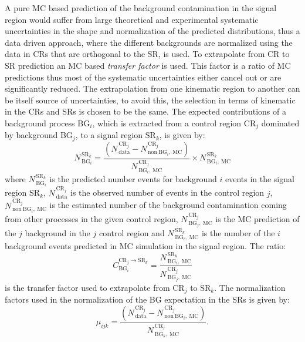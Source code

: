 A pure MC based prediction of the background contamination in the signal region
would suffer from large theoretical and experimental systematic uncertainties in
the shape and normalization of the predicted distributions, thus a data driven
approach, where the different backgrounds are normalized using the data in CRs
that are orthogonal to the SR, is used. To extrapolate from CR to SR prediction
an MC based \emph{transfer factor} is used. This factor is a ratio of MC
predictions thus most of the systematic uncertainties either cancel out or are
significantly reduced. The extrapolation from one kinematic region to another
can be itself source of uncertainties, to avoid this, the selection in terms of
kinematic in the CRs and SRs is chosen to be the same. The expected
contributions of a background process BG$_i$, which is extracted from a control
region CR$_j$ dominated by background BG$_j$, to a signal region SR$_k$, is
given by:
\begin{equation}
  \label{eq:83}
  N_{\mathrm{\, BG}_i}^{\mathrm{\, SR}_k} = \frac{(N_\mathrm{\,
      data}^{\mathrm{\, CR}_j} - N_{\mathrm{\,
        non~BG}_i,~\mathrm{MC}}^{\mathrm{\, CR}_j})}
  {N^{\mathrm{\, CR}_j}_{\mathrm{\, BG}_i \mathrm{,~MC}}} \times
  N^{\mathrm{\, SR}_k}_{\mathrm{\, BG}_i,~\mathrm{MC}}
\end{equation}
where $N_{\mathrm{\, BG}_i}^{\mathrm{\, SR}_k}$ is the predicted number events
for background $i$ events in the signal region SR$_k$,
$N_\mathrm{\, data}^{\mathrm{\, CR}_j}$ is the observed number of events in the
control region $j$, $N_{\mathrm{\, non~BG}_i,~\mathrm{MC}}^{\mathrm{\, CR}_j}$
is the estimated number of the background contamination coming from other
processes in the given control region,
$N^{\mathrm{\, CR}_j}_{\mathrm{\, BG}_j \mathrm{,~MC}}$ is the MC prediction of
the $j$ background in the $j$ control region and
$N^{\mathrm{\, SR}_k}_{\mathrm{\, BG}_i,~\mathrm{MC}}$ is the number of the $i$
background events predicted in MC simulation in the signal region. The ratio:
\begin{equation}
  \label{eq:84}
  C_{\mathrm{BG}_i}^{\mathrm{CR}_j \rightarrow \mathrm{SR}_k} = \frac{
    N^{\mathrm{\, SR}_k}_{\mathrm{\, BG}_i,~\mathrm{MC}}}{N^{\mathrm{\,
        CR}_j}_{\mathrm{\, BG}_j \mathrm{,~MC}}}
\end{equation}
is the transfer factor used to extrapolate from CR$_j$ to SR$_k$. The
normalization factors used in the normalization of the BG expectation in the SRs
is given by:
\begin{equation}
  \label{eq:85}
  \mu_{ijk} = \frac{(N_\mathrm{\, data}^{\mathrm{\, CR}_j} - N_{\mathrm{\,
        non~BG}_i,~\mathrm{MC}}^{\mathrm{\, CR}_j})}{N^{\mathrm{\,
        CR}_j}_{\mathrm{\, BG}_k \mathrm{,~MC}}}.
\end{equation}
